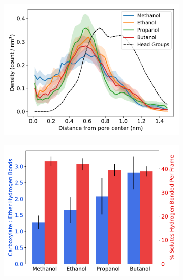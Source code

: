\documentclass{article}
\begin{document}
  \begin{figure}
  \centering
  \begin{subfigure}{0.325\textwidth}
  \includegraphics[width=\linewidth]{simple_alcohol_rdf.pdf}
  \caption{}\label{fig:simple_alcohol_rdf}
  \end{subfigure}
  \begin{subfigure}{0.325\textwidth}
  \includegraphics[width=\linewidth]{simple_alcohol_hbonds.pdf}
  \caption{}\label{fig:simple_alcohol_hbonds}
  \end{subfigure}
  \begin{subfigure}{0.325\textwidth}

\end{subfigure}
\end{figure}
\end{document}
